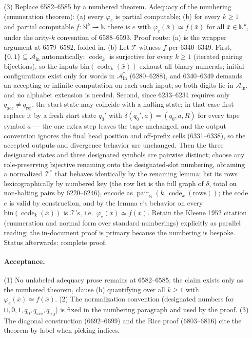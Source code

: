 (3) Replace 6582--6585 by a numbered theorem.  Adequacy of the numbering (enumeration theorem): (a) every \(\varphi_e\) is partial computable; (b) for every \(k\geq1\) and partial computable \(f:\mathbb N^k\rightharpoonup\mathbb N\) there is \(e\) with \(\varphi_e(\bar x)\simeq f(\bar x)\) for all \(\bar x\in\mathbb N^k\), under the arity-\(k\) convention of 6588--6593.  Proof route: (a) is the wrapper argument at 6579--6582, folded in.  (b) Let \(\mathcal T\) witness \(f\) per 6340--6349.  First, \(\{0,1\}\subseteq\mathcal A_{\mathrm{in}}\) automatically: \(\operatorname{code}_k\) is surjective for every \(k\geq1\) (iterated pairing bijections), so the inputs \(\mathrm{bin}(\operatorname{code}_k(\bar x))\) exhaust all binary numerals; initial configurations exist only for words in \(\mathcal A_{\mathrm{in}}^*\) (6280--6288), and 6340--6349 demands an accepting or infinite computation on each such input; so both digits lie in \(\mathcal A_{\mathrm{in}}\), and no alphabet extension is needed.  Second, since 6233--6234 requires only \(q_{\mathrm{acc}}\neq q_{\mathrm{rej}}\), the start state may coincide with a halting state; in that case first replace it by a fresh start state \(q_0'\) with \(\delta(q_0',a)=(q_0,a,R)\) for every tape symbol \(a\) --- the one extra step leaves the tape unchanged, and the output convention ignores the final head position and off-prefix cells (6331--6338), so the accepted outputs and divergence behavior are unchanged.  Then the three designated states and three designated symbols are pairwise distinct; choose any role-preserving bijective renaming onto the designated-slot numbering, obtaining a normalized \(\mathcal T^*\) that behaves identically by the renaming lemma; list its rows lexicographically by numbered key (the row list is the full graph of \(\delta\), total on non-halting pairs by 6220--6246), encode as \(\operatorname{pair}_{\mathbb N}(k,\operatorname{code}_k(\text{rows}))\); the code \(e\) is valid by construction, and by the lemma \(e\)'s behavior on every \(\mathrm{bin}(\operatorname{code}_k(\bar x))\) is \(\mathcal T\)'s, i.e.\ \(\varphi_e(\bar x)\simeq f(\bar x)\).  Retain the Kleene 1952 citation (enumeration and normal form over standard numberings) explicitly as parallel reading; the in-document proof is primary because the numbering is bespoke.  Status afterwards: complete proof.

\paragraph{Acceptance.} (1) No unlabeled adequacy prose remains at 6582--6585; the claim exists only as the numbered theorem, clause (b) quantifying over all \(k\geq1\) with \(\varphi_e(\bar x)\simeq f(\bar x)\).  (2) The normalization convention (designated numbers for \(\sqcup,0,1,q_0,q_{\mathrm{acc}},q_{\mathrm{rej}}\)) is fixed in the numbering paragraph and used by the proof.  (3) The diagonal construction (6692--6699) and the Rice proof (6803--6816) cite the theorem by label when picking indices.

